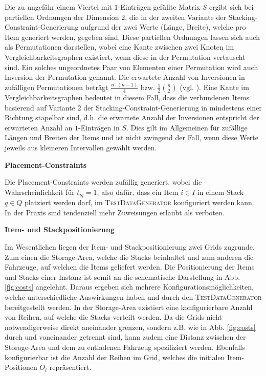 Die zu ungefähr einem Viertel mit $1$-Einträgen gefüllte Matrix $S$ ergibt sich bei partiellen Ordnungen der Dimension $2$,
die in der zweiten Variante der Stacking-Constraint-Generierung aufgrund der zwei Werte (Länge, Breite),
welche pro Item generiert werden, gegeben sind.
Diese partiellen Ordnungen lassen sich auch als Permutationen darstellen, wobei eine Kante zwischen
zwei Knoten im Vergleichbarkeitsgraphen existiert, wenn diese in der Permutation
vertauscht sind. Ein solches ungeordnetes Paar von Elementen einer Permutation wird auch Inversion
der Permutation genannt. Die erwartete Anzahl von Inversionen in zufälligen Permutationen
beträgt $\frac{n \cdot (n - 1)}{4}$ bzw. $\frac{1}{2} \binom{n}{2}$ (vgl. \citet{Heuberger2012}).
Eine Kante im Vergleichbarkeitsgraphen bedeutet in diesem Fall, dass die verbundenen Items
basierend auf Variante 2 der Stacking-Constraint-Generierung in mindestens einer Richtung stapelbar sind,
d.h. die erwartete Anzahl der Inversionen entspricht der erwarteten Anzahl an $1$-Einträgen in $S$.
Dies gilt im Allgemeinen für zufällige Längen und Breiten der Items und ist nicht zwingend der Fall,
wenn diese Werte jeweils aus kleineren Intervallen gewählt werden.


\textbf{Placement-Constraints}

Die Placement-Constraints werden zufällig generiert, wobei die Wahrscheinlichkeit für $t_{iq} = 1$, also dafür,
dass ein Item $i \in I$ in einem Stack $q \in Q$ platziert werden darf, im \textsc{TestDataGenerator} konfiguriert werden kann.
In der Praxis sind tendenziell mehr Zuweisungen erlaubt als verboten.

\textbf{Item- und Stackpositionierung}

Im Wesentlichen liegen der Item- und Stackpositionierung zwei Grids zugrunde. Zum einen die Storage-Area,
welche die Stacks beinhaltet und zum anderen die Fahrzeuge, auf welchen die Items geliefert werden.
Die Positionierung der Items und Stacks einer Instanz ist somit an die schematische Darstellung in Abb. \ref{fig:costs}
angelehnt. Daraus ergeben sich mehrere Konfigurationsmöglichkeiten, welche unterschiedliche Auswirkungen haben
und durch den \textsc{TestDataGenerator} bereitgestellt werden.
In der Storage-Area existiert eine konfigurierbare Anzahl von Reihen, auf welche die Stacks verteilt werden.
Da die Grids nicht notwendigerweise direkt aneinander grenzen, sondern z.B. wie in Abb. \ref{fig:costs}
durch  und  voneinander getrennt sind, kann zudem eine Distanz
zwischen der Storage-Area und dem zu entladenen Fahrzeug spezifiziert werden.
Ebenfalls konfigurierbar ist die Anzahl der Reihen im Grid, welches die initialen Item-Positionen $O_i$ repräsentiert.

